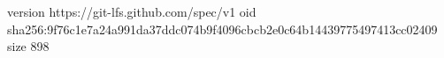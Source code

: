 version https://git-lfs.github.com/spec/v1
oid sha256:9f76c1e7a24a991da37ddc074b9f4096cbcb2e0c64b14439775497413cc02409
size 898
